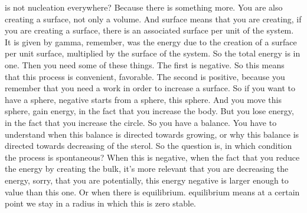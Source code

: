 is not nucleation everywhere? Because there is something more. You are also creating a surface, not only a volume.
And surface means that you are creating, if you are creating a surface, there is an associated surface per unit of the system. It is given by gamma, remember, was the energy due to the creation of a surface per unit surface, multiplied by the surface of the system. So the total energy is in one. Then you need some of these things. The first is negative. So this means that this process is convenient, favorable. The second is positive, because you remember that you need a work in order to increase a surface. So if you want to have a sphere, negative starts from a sphere, this sphere. And you move this sphere, gain energy, in the fact that you increase the body. But you lose energy, in the fact that you increase the circle. So you have a balance. You have to understand when this balance is directed towards growing, or why this balance is directed towards decreasing of the sterol. So the question is, in which condition the process is spontaneous? When this is negative, when the fact that you reduce the energy by creating the bulk, it's more relevant that you are decreasing the energy, sorry, that you are potentially, this energy negative is larger enough to value than this one. Or when there is equilibrium. equilibrium means at a certain point we stay in a radius in which this is zero stable.
